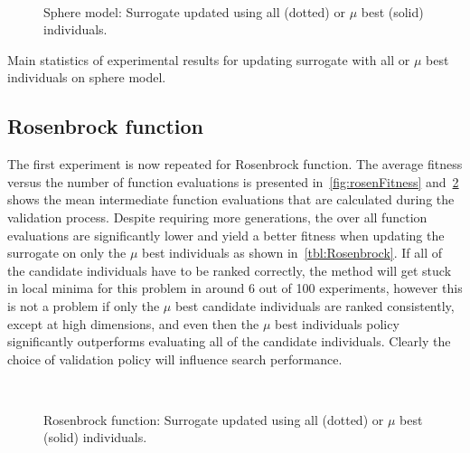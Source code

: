 \begin{figure}
\label{fig:sphereFitness}
\,
\label{fig:sphereIntmEval}
\caption{Sphere model: Surrogate updated using all (dotted) or $\mu$ best (solid) individuals.}
\end{figure}

\begin{table} \centering
\caption{Main statistics of experimental results for updating surrogate with all or $\mu$ best individuals on sphere model.}\label{tbl:Sphere}

\end{table}

\subsection{Rosenbrock function}\label{sec:rosen}
The first experiment is now repeated for Rosenbrock function.
The average fitness versus the number of function evaluations is presented in~\cref{fig:rosenFitness} and~\cref{fig:rosenIntmEval} shows the mean intermediate function evaluations that are calculated during the validation process. Despite requiring more generations, the over all function evaluations are significantly lower and yield a better fitness when updating the surrogate on only the $\mu$ best individuals as shown in~\cref{tbl:Rosenbrock}. If all of the candidate individuals have to be ranked correctly, the method will get stuck in local minima for this problem in around 6 out of 100 experiments, however this is not a problem if only the $\mu$ best candidate individuals are ranked consistently, except at high dimensions, and even then the $\mu$ best individuals  policy significantly outperforms evaluating all of the candidate individuals. Clearly the choice of validation policy will influence search performance. 

\begin{figure}
\label{fig:rosenFitness}
\,
\label{fig:rosenIntmEval}
\caption{Rosenbrock function: Surrogate updated using all (dotted) or $\mu$ best (solid) individuals.}
\end{figure}

